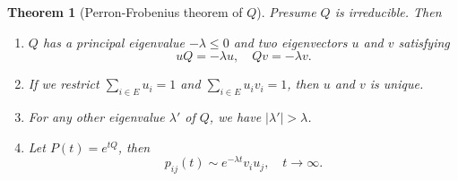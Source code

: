 \documentclass[12pt]{article}
\renewcommand{\(}{\left(}%
\renewcommand{\)}{\right)}%
\renewcommand{\[}{\left[}%
\renewcommand{\]}{\right]}%
\newtheorem{theorem}{Theorem}[section]}
\begin{document}
  \begin{theorem}[Perron-Frobenius theorem of $Q$]
    Presume $Q$ is irreducible. Then
    \begin{enumerate}
      \item $Q$ has a principal eigenvalue $-\lambda\leq 0$ and two eigenvectors $u$ and $v$ satisfying
          \begin{equation*}
            uQ=-\lambda u,\quad Qv=-\lambda v.
          \end{equation*}
      \item If we restrict $\sum_{i\in E}u_i=1$ and $\sum_{i\in E}u_iv_i=1$, then $u$ and $v$ is unique.
      \item For any other eigenvalue $\lambda'$ of $Q$, we have $|\lambda' |>\lambda$.
      \item Let $P(t)=e^{tQ}$, then
      \begin{equation*}
        p_{ij}(t)\sim e^{-\lambda t}v_iu_j,\quad t\to\infty.
      \end{equation*}
    \end{enumerate}
  \end{theorem}
\end{document}
